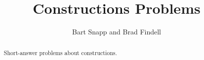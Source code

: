 \documentclass[nooutcomes]{ximera}
\title{Constructions Problems}
\author{Bart Snapp and Brad Findell}
\begin{document}
\begin{abstract}
Short-answer problems about constructions. 
\end{abstract}
\maketitle


%
\end{document}
